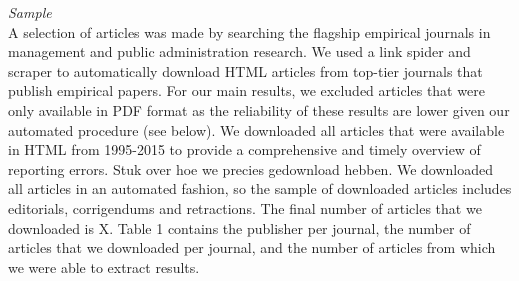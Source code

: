 \documentclass[english,man]{apa6}
\begin{document}
\emph{Sample}\\\hspace*{0.333em}\hspace*{0.333em}\hspace*{0.333em}\hspace*{0.333em}\hspace*{0.333em}\hspace*{0.333em}A
selection of articles was made by searching the flagship empirical
journals in management and public administration research. We used a
link spider and scraper to automatically download HTML articles from
top-tier journals that publish empirical papers. For our main results,
we excluded articles that were only available in PDF format as the
reliability of these results are lower given our automated procedure
(see below). We downloaded all articles that were available in HTML from
1995-2015 to provide a comprehensive and timely overview of reporting
errors. Stuk over hoe we precies gedownload hebben. We downloaded all
articles in an automated fashion, so the sample of downloaded articles
includes editorials, corrigendums and retractions. The final number of
articles that we downloaded is X. Table 1 contains the publisher per
journal, the number of articles that we downloaded per journal, and the
number of articles from which we were able to extract results.
\end{document}
